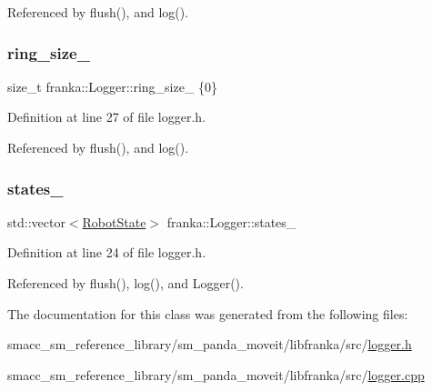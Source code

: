 Referenced by flush(), and log().

\mbox{\label{classfranka_1_1Logger_ab70ce51d314081d2f467a6dfbf1f80a4}} 
\subsubsection{\texorpdfstring{ring\+\_\+size\+\_\+}{ring\_size\_}}
{\footnotesize\ttfamily size\+\_\+t franka\+::\+Logger\+::ring\+\_\+size\+\_\+ \{0\}\hspace{0.3cm}{\ttfamily [private]}}



Definition at line 27 of file logger.\+h.



Referenced by flush(), and log().

\mbox{\label{classfranka_1_1Logger_aea60d37797979d786e7653168cf49ecb}} 
\subsubsection{\texorpdfstring{states\+\_\+}{states\_}}
{\footnotesize\ttfamily std\+::vector$<$\hyperlink{structfranka_1_1RobotState}{Robot\+State}$>$ franka\+::\+Logger\+::states\+\_\+\hspace{0.3cm}{\ttfamily [private]}}



Definition at line 24 of file logger.\+h.



Referenced by flush(), log(), and Logger().



The documentation for this class was generated from the following files\+:\begin{DoxyCompactItemize}
\item 
smacc\+\_\+sm\+\_\+reference\+\_\+library/sm\+\_\+panda\+\_\+moveit/libfranka/src/\hyperlink{logger_8h}{logger.\+h}\item 
smacc\+\_\+sm\+\_\+reference\+\_\+library/sm\+\_\+panda\+\_\+moveit/libfranka/src/\hyperlink{logger_8cpp}{logger.\+cpp}\end{DoxyCompactItemize}
